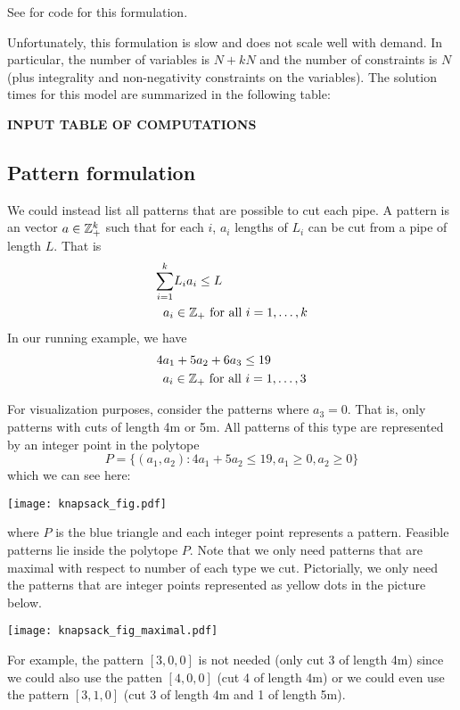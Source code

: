 \documentclass[../open-optimization/open-optimization.tex]{subfiles}
\begin{document}
See  for code for this formulation.

Unfortunately, this formulation is slow and does not scale well with demand.  In particular, the number of variables is $N + kN$ and the number of constraints is $N$ (plus integrality and non-negativity constraints on the variables).  
The solution times for this model are summarized in the following table:
\begin{center}
\textbf{INPUT TABLE OF COMPUTATIONS}
\end{center}


\subsection{Pattern formulation}
We could instead list all patterns that are possible to cut each pipe.   A pattern is an vector $a \in {\mathbb{Z}}^k_+$ such that for each $i$, $a_i$ lengths of $L_i$ can be cut from a pipe of length $L$.  That is
\begin{equation}
\begin{split}
\sum_{i=1}^k &L_i a_i \leq L\\
a_i &\in {\mathbb{Z}}_+ \ \text{for all } i=1, \dots, k
\end{split}
\end{equation}
In our running example, we have 
\begin{equation}
\begin{split}
4 &a_1 + 5 a_2 + 6 a_3 \leq 19\\
&a_i \in {\mathbb{Z}}_+ \ \text{for all } i=1, \dots, 3
\end{split}
\end{equation}

For visualization purposes, consider the patterns where $a_3 = 0$.  That is, only patterns with cuts of length 4m or 5m.  All patterns of this type are represented by an integer point in the polytope 
\begin{equation}
P = \{(a_1,a_2) : 4a_1 + 5 a_2 \leq 19, a_1\geq 0, a_2 \geq 0\}
\end{equation}
which we can see here:
\begin{center}
\texttt{[image: knapsack\_fig.pdf]}
\end{center}
where $P$ is the blue triangle and each integer point represents a pattern.  Feasible patterns lie inside the polytope $P$.  Note that we only need patterns that are maximal with respect to number of each type we cut.  Pictorially, we only need the patterns that are integer points represented as yellow dots in the picture below.
\begin{center}
\texttt{[image: knapsack\_fig\_maximal.pdf]}
\end{center}
For example, the pattern $[3,0,0]$ is not needed (only cut 3 of length 4m) since we could also use the patten $[4,0,0]$ (cut 4 of  length 4m) or we could even use the pattern $[3,1,0]$  (cut 3 of length 4m and 1 of length 5m).
\end{document}
